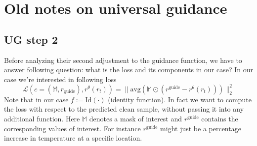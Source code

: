 \documentclass[a4paper,12pt]{article}
\begin{document}


\clearpage
\section{Old notes on universal guidance}

\subsection{UG step 2}
Before analyzing their second adjustment to the guidance function, we have to answer following question: what is the loss and its components in our case?
In our case we're interested in following loss
$$
\mathcal{L}(c=(\mathbb{M},r_{\text{guide}}), r^\theta(r_t))=\| \text{avg}(\mathbb{M} \odot (r^{\text{guide}} - r^\theta(r_t)))\|^2_2
$$
Note that in our case $f:=\text{Id}(\cdot)$ (identity function). In fact we want to compute the loss with respect to the predicted clean sample, without passing it into any additional function.
Here $\mathbb{M}$ denotes a mask of interest and $r^{\text{guide}}$ contains the corresponding values of interest. For instance $r^{\text{guide}}$ might just be a percentage increase in temperature at a specific location.
\end{document}
